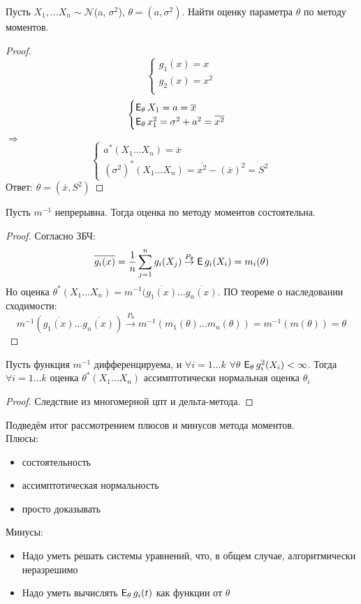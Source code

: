 \begin{example}
Пусть $X_1, \ldots X_n \sim \mathcal{N}$(a, $\sigma^2$), $\theta = (a, \sigma^2)$. Найти оценку параметра $\theta$ по методу моментов.
\end{example}
\begin{proof}
$$
\begin{cases}
g_1(x) = x \\
g_2(x) = x^2
\\
\end{cases}
$$
$$
\begin{cases}
\E_{\theta}X_1 = a = \overline{x} \\
\E_{\theta}x^2_{1} = \sigma^2 + a^2 = \overline{x^2}\\
\end{cases}
$$
$\Rightarrow$
$$
\begin{cases}
 a^{*}(X_1 \ldots X_n) = \overline{x} \\
(\sigma^2)^{*}(X_1 \ldots X_n) = \overline{x^2} - (\overline{x})^2 = S^2
\end{cases}
$$
Ответ: $\theta = (\overline{x}, S^2)$
\end{proof}

\begin{lemma}
Пусть $m^{-1}$ непрерывна. Тогда оценка по методу моментов состоятельна.
\end{lemma}
\begin{proof}
Согласно ЗБЧ:
$$
\overline{g_i(x)} = \frac{1}{n}\sum_{j = 1}^{n}g_i(X_j) \overset{P_\theta}{\to} \E g_i(X_i) = m_i(\theta)
$$
Но оценка $\theta^{*}(X_1 \ldots X_n) = m^{-1}(\overline{g_1(x)} \ldots \overline{g_n(x)}$. ПО теореме о наследовании сходимости:
$$
m^{-1}(\overline{g_1(x)} \ldots \overline{g_n(x)}) \overset{P_\theta}{\to} m^{-1}(m_1(\theta) \ldots m_n(\theta)) = m^{-1}(m(\theta)) = \theta
$$
\end{proof}

\begin{lemma}
Пусть функция $m^{-1}$ дифференцируема, и $\forall i = 1 \ldots k$ $\forall \theta$ $\E_\theta g^2_i(X_i) < \infty$. Тогда $\forall i = 1 \ldots k$ оценка $\theta^{*}(X_1 \ldots X_n)$ ассимптотически нормальная оценка $\theta_i$
\end{lemma}
\begin{proof}
Следствие из многомерной цпт и дельта-метода. \TODO{}
\end{proof}
Подведём итог рассмотрением плюсов и минусов метода моментов.\\
Плюсы:
\begin{itemize}
    \item состоятельность
    \item ассимптотическая нормальность
    \item просто доказывать
\end{itemize}
Минусы:
\begin{itemize}
    \item Надо уметь решать системы уравнений, что, в общем случае, алгоритмически неразрешимо
    \item Надо уметь вычислять $\E_\theta g_i(t)$ как функции от $\theta$
\end{itemize}

